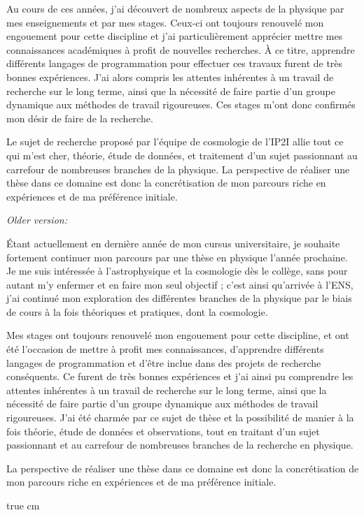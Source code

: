 \documentclass[11pt,a4]{article}
\begin{document}
Au cours de ces années, j'ai découvert de nombreux aspects de la physique
par mes enseignements et par mes stages. Ceux-ci ont toujours
renouvelé mon engouement pour cette discipline et 
j'ai particulièrement apprécier mettre mes connaissances académiques à
profit de nouvelles recherches. À ce titre, apprendre différents
langages de programmation pour effectuer ces travaux furent de très
bonnes expériences. J'ai alors compris les attentes inhérentes à un
travail de recherche sur le long terme, ainsi que la 
nécessité de faire partie d'un groupe dynamique aux méthodes de
travail rigoureuses.  Ces stages m'ont donc confirmés mon désir de
faire de la recherche. 

Le sujet de recherche proposé par l'équipe de cosmologie de l'IP2I
allie tout ce qui m'est cher, théorie, étude de données, et traitement
d'un sujet passionnant au carrefour de nombreuses branches de la physique. 
La perspective de réaliser une thèse dans ce domaine est donc la
concrétisation de mon parcours riche en expériences et de ma préférence initiale.

\textit{Older version:}

Étant actuellement en dernière année de mon cursus universitaire, je souhaite fortement continuer
mon parcours par une thèse en physique l'année prochaine. Je me suis intéressée à l'astrophysique et
la cosmologie dès le collège, sans pour autant m'y enfermer et en faire mon seul objectif ; c'est
ainsi qu'arrivée à l'ENS, j'ai continué mon exploration des différentes branches de la physique par
le biais de cours à la fois théoriques et pratiques, dont la cosmologie.

Mes stages ont toujours renouvelé mon engouement pour cette discipline, et ont été l'occasion de
mettre à profit mes connaissances, d'apprendre différents langages de programmation et d'être inclue
dans des projets de recherche conséquents. Ce furent de très bonnes expériences et j'ai ainsi pu
comprendre les attentes inhérentes à un travail de recherche sur le long terme, ainsi que la
nécessité de faire partie d'un groupe dynamique aux méthodes de travail rigoureuses.  J'ai été
charmée par ce sujet de thèse et la possibilité de manier à la fois théorie, étude de données et
observations, tout en traitant d'un sujet passionnant et au carrefour de nombreuses branches de la
recherche en physique.

La perspective de réaliser une thèse dans ce domaine est donc la concrétisation de mon parcours
riche en expériences et de ma préférence initiale.

 true cm







\end{document}
